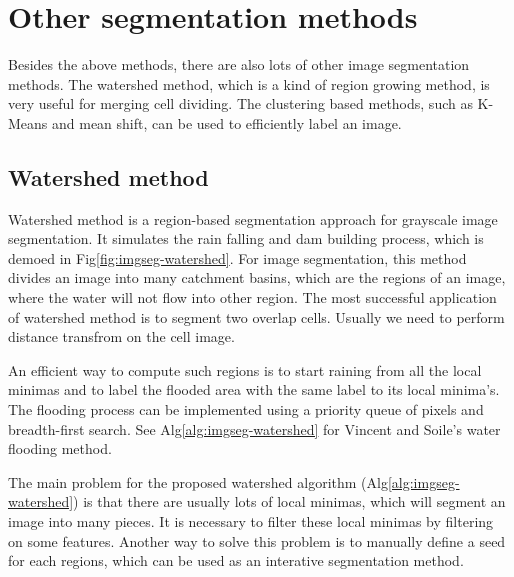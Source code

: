 \section{Other segmentation methods}
Besides the above methods, there are also lots of other image segmentation methods. The watershed method, which is a kind of region growing method, is very useful for merging cell dividing. The clustering based methods, such as K-Means and mean shift, can be used to efficiently label an image.
\subsection{Watershed method}
Watershed method\cite{vincent1991watersheds} is a region-based segmentation approach for grayscale image segmentation. It simulates the rain falling and dam building process, which is demoed in Fig\ref{fig:imgseg-watershed}. For image segmentation, this method divides an image into many catchment basins, which are the regions of an image, where the water will not flow into other region. The most successful application of watershed method is to segment two overlap cells. Usually we need to perform distance transfrom on the cell image.

An efficient way to compute such regions is to start raining from all the local minimas and to label the flooded area with the same label to its local minima's. The flooding process can be implemented using a priority queue of pixels and breadth-first search. See Alg\ref{alg:imgseg-watershed} for Vincent and Soile's water flooding method\cite{vincent1991watersheds}.

The main problem for the proposed watershed algorithm (Alg\ref{alg:imgseg-watershed}) is that there are usually lots of local minimas, which will segment an image into many pieces. It is necessary to filter these local minimas by filtering on some features. Another way to solve this problem is to manually define a seed for each regions, which can be used as an interative segmentation method.


